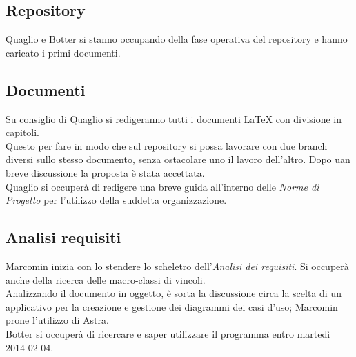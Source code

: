 \subsection{Repository}
Quaglio e Botter si stanno occupando della fase operativa del repository e hanno caricato i primi documenti.\\
\subsection{Documenti}
Su consiglio di Quaglio si redigeranno tutti i documenti \LaTeX{} con divisione in capitoli.\\
Questo per fare in modo che sul repository si possa lavorare con due branch diversi sullo stesso documento, senza ostacolare uno il lavoro dell'altro.
Dopo uan breve discussione la proposta è stata accettata.\\
Quaglio si occuperà di redigere una breve guida all'interno delle \emph{Norme di Progetto} per l'utilizzo della suddetta organizzazione.\\
\subsection{Analisi requisiti}
Marcomin inizia con lo stendere lo scheletro dell'\emph{Analisi dei requisiti}.
Si occuperà anche della ricerca delle macro-classi di vincoli.\\
Analizzando il documento in oggetto, è sorta la discussione circa la scelta di un applicativo per la creazione e gestione dei diagrammi dei casi d'uso; Marcomin prone l'utilizzo di Astra.\\
Botter si occuperà di ricercare e saper utilizzare il programma entro martedì 2014-02-04.\\

